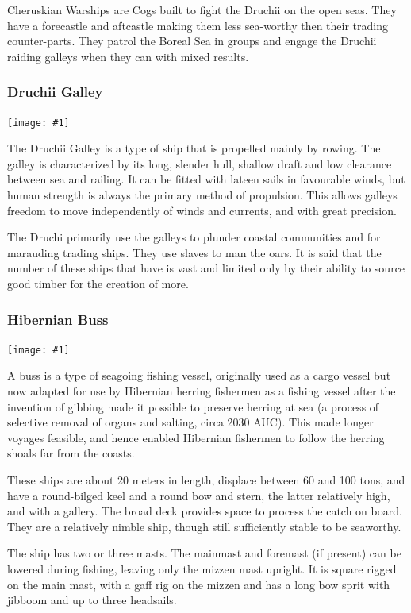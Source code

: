 \documentclass[a4paper]{dnd5}
\newcommand\inc[1]{
 \texttt{[image: \#1]}
}
\begin{document}
Cheruskian Warships are Cogs built to fight the Druchii on the open seas.  They have a forecastle and aftcastle making them less sea-worthy then their trading counter-parts.  They patrol the Boreal Sea in groups and engage the Druchii raiding galleys when they can with mixed results.  


\subsubsection*{Druchii Galley}
\inc{dark_elf_galley.jpg}

The Druchii Galley is a type of ship that is propelled mainly by rowing. The galley is characterized by its long, slender hull, shallow draft and low clearance between sea and railing.  It can be fitted with lateen sails in favourable winds, but human strength is always the primary method of propulsion. This allows galleys freedom to move independently of winds and currents, and with great precision. 

The Druchi primarily use the galleys to plunder coastal communities and for marauding trading ships.  They use slaves to man the oars.  It is said that the number of these ships that have is vast and limited only by their ability to source good timber for the creation of more.


\subsubsection*{Hibernian Buss}
\inc{hibernian_buss.jpg}

A buss is a type of seagoing fishing vessel, originally used as a cargo vessel but now adapted for use by Hibernian herring fishermen as a fishing vessel after the invention of gibbing made it possible to preserve herring at sea (a process of selective removal of organs and salting, circa 2030 AUC).  This made longer voyages feasible, and hence enabled Hibernian fishermen to follow the herring shoals far from the coasts. 

These ships are about 20 meters in length, displace between 60 and 100 tons, and have a round-bilged keel and a round bow and stern, the latter relatively high, and with a gallery. The broad deck provides space to process the catch on board.  They are a relatively nimble ship, though still sufficiently stable to be seaworthy.

The ship has two or three masts. The mainmast and foremast (if present) can be lowered during fishing, leaving only the mizzen mast upright. It is square rigged on the main mast, with a gaff rig on the mizzen and has a long bow sprit with jibboom and up to three headsails.
\end{document}
